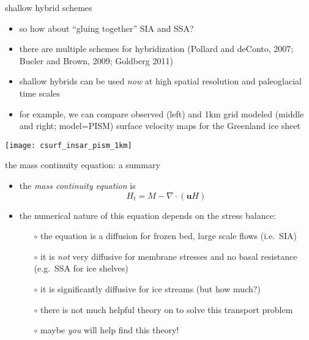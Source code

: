 \begin{frame}{shallow hybrid schemes}

\begin{itemize}
\item so how about ``gluing together'' SIA and SSA?
\item there are multiple schemes for hybridization (Pollard and deConto, 2007; Bueler and Brown, 2009; Goldberg 2011)
\item shallow hybrids can be used \emph{now} at high spatial resolution and paleoglacial time scales
\item for example, we can compare observed (left) and 1km grid modeled (middle and right; model=PISM) surface velocity maps for the Greenland ice sheet
\end{itemize}

\vspace{-4mm}
\begin{center}
\texttt{[image: csurf\_insar\_pism\_1km]}
\end{center}
\end{frame}


\begin{frame}{the mass continuity equation: a summary}

\begin{itemize}
\item the \emph{mass continuity equation} is
  $$H_t = M - \nabla \cdot (\mathbf{u} H)$$
\item the numerical nature of this equation depends on the stress balance:
  \begin{itemize}
  \item[$\circ$] the equation is a diffusion for frozen bed, large scale flows (i.e.~SIA)
  \item[$\circ$] it is \emph{not} very diffusive for membrane stresses and no basal resistance (e.g.~SSA for ice shelves)
  \item[$\circ$] it is significantly diffusive for ice streams (but how much?)
  \item[$\circ$] there is not much helpful theory on to solve this transport problem
  \item[$\circ$] maybe \emph{you} will help find this theory!
  \end{itemize}
\end{itemize}
\end{frame}

